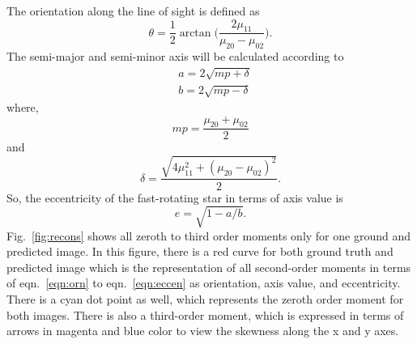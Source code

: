 The orientation along the line of sight is defined as
\begin{equation}
	\theta = \frac{1}{2}\arctan \big(\frac{2\mu_{11}}{\mu_{20} - \mu_{02}}\big).
	\label{eqn:orn}
\end{equation}
The semi-major and semi-minor axis will be calculated according to
\begin{equation}
	\begin{aligned}
		&a = 2\sqrt{mp + \delta} \\
		&b = 2\sqrt{mp - \delta}
	\end{aligned}
	\label{eqn:semi}
\end{equation}
where,
\begin{equation}
	mp = \frac{\mu_{20} + \mu_{02}}{2}
	\label{eqn:mp}
\end{equation}
and
\begin{equation}
	\delta = \frac{\sqrt{4\mu_{11}^2 + (\mu_{20} - \mu_{02})^2}}{2}.	
	\label{eqn:delta}
\end{equation}
So, the eccentricity of the fast-rotating star in terms of axis value is 
\begin{equation}
	e = \sqrt{1 - a/b}.
	\label{eqn:eccen}
\end{equation}
Fig.~\ref{fig:recons} shows all zeroth to third order moments only for one ground and predicted image. In this figure, there is a red curve for both ground truth and predicted image which is the representation of all second-order moments in terms of eqn.~\ref{eqn:orn} to eqn.~\ref{eqn:eccen} as orientation, axis value, and eccentricity. There is a cyan dot point as well, which represents the zeroth order moment for both images. There is also a third-order moment, which is expressed in terms of arrows in magenta and blue color to view the skewness along the x and y axes.
